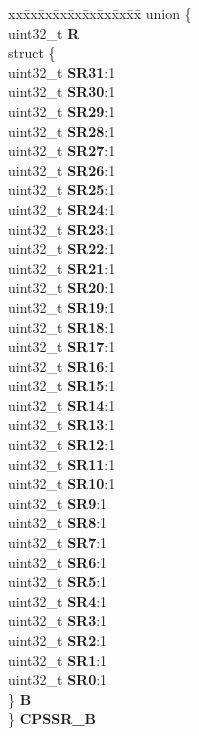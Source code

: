 \begin{DoxyCompactItemize}
\begin{tabbing}
\end{tabbing}\item 
\mbox{\label{structETPU__tag_a1ded4243999ec4543fd08471df378753}} 
\begin{tabbing}
xx\=xx\=xx\=xx\=xx\=xx\=xx\=xx\=xx\=\kill
union \{\\
\>uint32\_t {\bfseries R}\\
\>struct \{\\
\>\>uint32\_t {\bfseries SR31}:1\\
\>\>uint32\_t {\bfseries SR30}:1\\
\>\>uint32\_t {\bfseries SR29}:1\\
\>\>uint32\_t {\bfseries SR28}:1\\
\>\>uint32\_t {\bfseries SR27}:1\\
\>\>uint32\_t {\bfseries SR26}:1\\
\>\>uint32\_t {\bfseries SR25}:1\\
\>\>uint32\_t {\bfseries SR24}:1\\
\>\>uint32\_t {\bfseries SR23}:1\\
\>\>uint32\_t {\bfseries SR22}:1\\
\>\>uint32\_t {\bfseries SR21}:1\\
\>\>uint32\_t {\bfseries SR20}:1\\
\>\>uint32\_t {\bfseries SR19}:1\\
\>\>uint32\_t {\bfseries SR18}:1\\
\>\>uint32\_t {\bfseries SR17}:1\\
\>\>uint32\_t {\bfseries SR16}:1\\
\>\>uint32\_t {\bfseries SR15}:1\\
\>\>uint32\_t {\bfseries SR14}:1\\
\>\>uint32\_t {\bfseries SR13}:1\\
\>\>uint32\_t {\bfseries SR12}:1\\
\>\>uint32\_t {\bfseries SR11}:1\\
\>\>uint32\_t {\bfseries SR10}:1\\
\>\>uint32\_t {\bfseries SR9}:1\\
\>\>uint32\_t {\bfseries SR8}:1\\
\>\>uint32\_t {\bfseries SR7}:1\\
\>\>uint32\_t {\bfseries SR6}:1\\
\>\>uint32\_t {\bfseries SR5}:1\\
\>\>uint32\_t {\bfseries SR4}:1\\
\>\>uint32\_t {\bfseries SR3}:1\\
\>\>uint32\_t {\bfseries SR2}:1\\
\>\>uint32\_t {\bfseries SR1}:1\\
\>\>uint32\_t {\bfseries SR0}:1\\
\>\} {\bfseries B}\\
\} {\bfseries CPSSR\_B}\\


\end{tabbing}
\end{DoxyCompactItemize}
